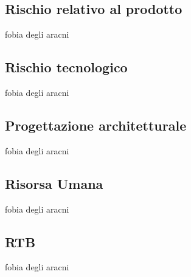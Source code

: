 \subsection{Rischio relativo al prodotto} 
fobia degli aracni
\subsection{Rischio tecnologico} 
fobia degli aracni
\subsection{Progettazione architetturale} 
fobia degli aracni
\subsection{Risorsa Umana} 
fobia degli aracni
\subsection{RTB} 
fobia degli aracni

